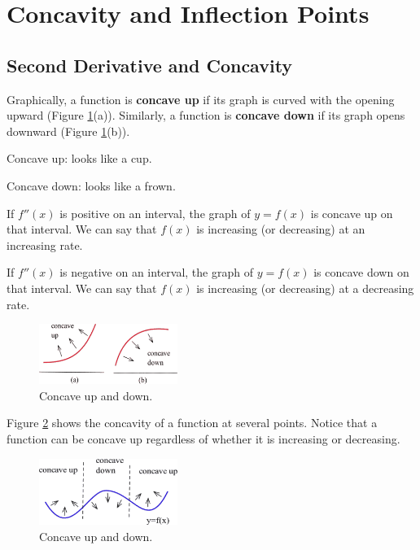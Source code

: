 \section{Concavity and Inflection Points}
\label{sec:concavity}

\subsection{Second Derivative and Concavity}

\begin{definition}
Graphically, a function is {\bf concave up} if its graph is curved with the opening upward (Figure \ref{fig:3-3-concavity}(a)). Similarly, a function is {\bf concave down} if its graph opens downward (Figure \ref{fig:3-3-concavity}(b)).

Concave up: looks like a cup.

Concave down: looks like a frown.


If $f''(x)$ is positive on an interval, the graph of $y=f(x)$ is concave up on that interval. We can say that $f(x)$ is increasing (or decreasing) at an increasing rate.

If $f''(x)$ is negative on an interval, the graph of $y=f(x)$ is concave down on that interval. We can say that $f(x)$ is increasing (or decreasing) at a decreasing rate.
\end{definition}

\begin{figure}[!ht]
  \centering
    \includegraphics[width=0.4\textwidth]{img/chap3/image044.png}
    \caption{Concave up and down.}
    \label{fig:3-3-concavity}
\end{figure}
Figure \ref{fig:3-3-concavity2} shows the concavity of a function at several points. Notice that a function can be concave up regardless of whether it is increasing or decreasing.

\begin{figure}[!ht]
  \centering
    \includegraphics[width=0.4\textwidth]{img/chap3/image045.png}
    \caption{Concave up and down.}
    \label{fig:3-3-concavity2}
\end{figure}

